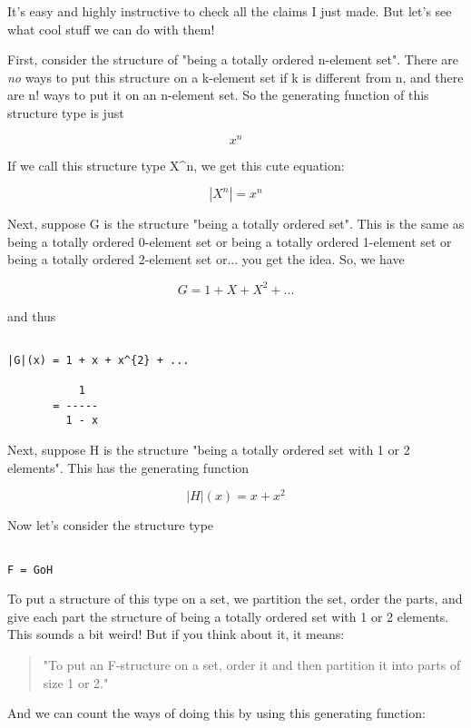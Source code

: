It's easy and highly instructive to check all the claims I just made. 
But let's see what cool stuff we can do with them!   

First, consider the structure of "being a totally ordered n-element
set".  There are \emph{no} 
ways to put this structure on a k-element set if
k is different from n, and there are n! ways to put it on an n-element 
set.  So the generating function of this structure type is just


$$

x^{n}
$$
    
If we call this structure type X^{n}, we get this cute equation:


$$

|X^{n}| = x^{n}
$$
    
Next, suppose G is the structure "being a totally ordered set".  This 
is the same as being a totally ordered 0-element set or being a totally
ordered 1-element set or being a totally ordered 2-element set or... 
you get the idea.  So, we have


$$

     G = 1 + X + X^{2} + ...
$$
    
and thus


\begin{verbatim}

|G|(x) = 1 + x + x^{2} + ...
 
           1
       = -----
         1 - x
\end{verbatim}
    
Next, suppose H is the structure "being a totally ordered set with 1 
or 2 elements".  This has the generating function


$$

|H|(x) = x + x^{2}
$$
    
Now let's consider the structure type


\begin{verbatim}

F = GoH
\end{verbatim}
    
To put a structure of this type on a set, we partition the set, order the
parts, and give each part the structure of being a totally ordered set
with 1 or 2 elements.  This sounds a bit weird!  But if you think about
it, it means:

\begin{quote}
      "To put an F-structure on a set, order it and then partition
       it into parts of size 1 or 2."
\end{quote}
And we can count the ways of doing this by using this generating function:


